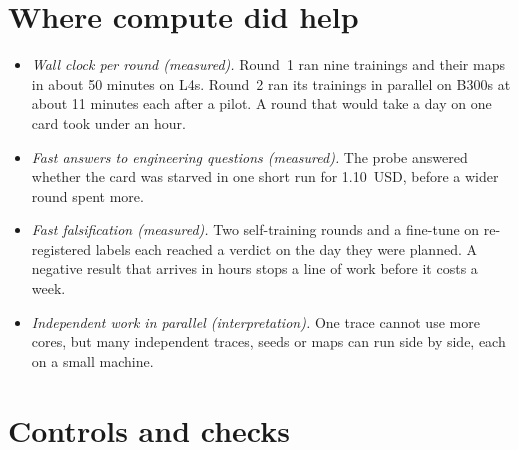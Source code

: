 \documentclass[11pt]{article}
\begin{document}
\section{Where compute did help}\label{sec:helped}

\begin{itemize}
\item \emph{Wall clock per round (measured).} Round~1 ran nine trainings and their maps in about 50 minutes on L4s. Round~2 ran its trainings in parallel on B300s at about 11 minutes each after a pilot. A round that would take a day on one card took under an hour.
\item \emph{Fast answers to engineering questions (measured).} The probe answered whether the card was starved in one short run for 1.10~USD, before a wider round spent more.
\item \emph{Fast falsification (measured).} Two self-training rounds and a fine-tune on re-registered labels each reached a verdict on the day they were planned. A negative result that arrives in hours stops a line of work before it costs a week.
\item \emph{Independent work in parallel (interpretation).} One trace cannot use more cores, but many independent traces, seeds or maps can run side by side, each on a small machine.
\end{itemize}

\section{Controls and checks}\label{sec:controls}
\end{document}
